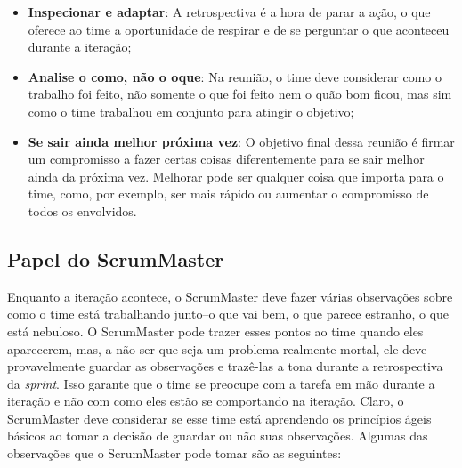 \documentclass{iiufrgs}
\begin{document}
\begin{itemize}[leftmargin=3em, noitemsep, nosep, before=\vspace{1cm}, after=\vspace{1cm}]
    \setlength{\itemindent}{1em}
    \item \textbf{Inspecionar e adaptar}: A retrospectiva é a hora de parar a ação, o que oferece ao time a oportunidade de respirar e de se perguntar o que aconteceu durante a iteração;
    \item \textbf{Analise o como, não o oque}: Na reunião, o time deve considerar como o trabalho foi feito, não somente o que foi feito nem o quão bom ficou, mas sim como o time trabalhou em conjunto para atingir o objetivo;
    \item \textbf{Se sair ainda melhor próxima vez}: O objetivo final dessa reunião é firmar um compromisso a fazer certas coisas diferentemente para se sair melhor ainda da próxima vez. Melhorar pode ser qualquer coisa que importa para o time, como, por exemplo, ser mais rápido ou aumentar o compromisso de todos os envolvidos.
\end{itemize}

\subsection{Papel do ScrumMaster}

Enquanto a iteração acontece, o ScrumMaster deve fazer várias observações sobre como o time está trabalhando junto--o que vai bem, o que parece estranho, o que está nebuloso. O ScrumMaster pode trazer esses pontos ao time quando eles aparecerem, mas, a não ser que seja um problema realmente mortal, ele deve provavelmente guardar as observações e trazê-las a tona durante a retrospectiva da \textit{sprint}. Isso garante que o time se preocupe com a tarefa em mão durante a iteração e não com como eles estão se comportando na iteração. Claro, o ScrumMaster deve considerar se esse time está aprendendo os princípios ágeis básicos ao tomar a decisão de guardar ou não suas observações. Algumas das observações que o ScrumMaster pode tomar são as seguintes:
\end{document}
